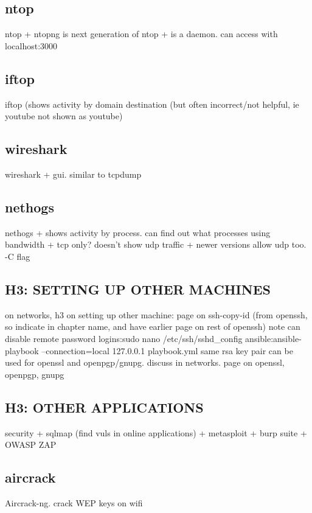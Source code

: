 \subsection{ntop}
ntop
+ ntopng is next generation of ntop
+ is a daemon. can access with localhost:3000
\subsection{iftop}
iftop (shows activity by domain destination (but often incorrect/not helpful, ie youtube not shown as youtube)
\subsection{wireshark}

wireshark
+ gui. similar to tcpdump

\subsection{nethogs}
nethogs
+ shows activity by process. can find out what processes using bandwidth
+ tcp only? doesn't show udp traffic
+ newer versions allow udp too. -C flag
\subsection{H3: SETTING UP OTHER MACHINES}
on networks, h3 on setting up other machine:
page on ssh-copy-id (from openssh, so indicate in chapter name, and have earlier page on rest of openssh)
note can disable remote password logins:sudo nano /etc/ssh/sshd\_config
ansible:ansible-playbook --connection=local 127.0.0.1 playbook.yml
same rsa key pair can be used for openssl and openpgp/gnupg. discuss in networks. page on openssl, openpgp, gnupg
\subsection{H3: OTHER APPLICATIONS}
security
+ sqlmap (find vuls in online applications)
+ metasploit
+ burp suite
+ OWASP ZAP
\subsection{aircrack}
Aircrack-ng. crack WEP keys on wifi


